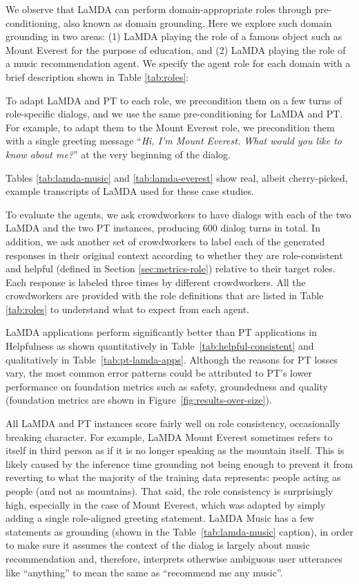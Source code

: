 We observe that LaMDA can perform domain-appropriate roles through pre-conditioning, also known as domain grounding. Here we explore such domain grounding in two areas: (1) LaMDA playing the role of  a famous object such as Mount Everest for the purpose of education, and (2) LaMDA playing the role of a music recommendation agent. We specify the agent role for each domain with a brief description shown in Table \ref{tab:roles}:

To adapt LaMDA and PT to each role, we precondition them on a few turns of role-specific dialogs, and we use the same pre-conditioning for LaMDA and PT. For example, to adapt them to the Mount Everest role, we precondition them with a single greeting message ``\textit{Hi, I’m Mount Everest. What would you like to know about me?}'' at the very beginning of the dialog. 

Tables \ref{tab:lamda-music} and \ref{tab:lamda-everest} show real, albeit cherry-picked, example transcripts of LaMDA used for these case studies.

\FloatBarrier

To evaluate the agents, we ask crowdworkers to have dialogs with each of the two LaMDA and the two PT instances, producing 600 dialog turns in total. In addition, we ask another set of crowdworkers to label each of the generated responses in their original context according to whether they are role-consistent and helpful (defined in Section \ref{sec:metrics-role}) relative to their target roles. Each response is labeled three times by different crowdworkers. All the crowdworkers are provided with the role definitions that are listed in Table \ref{tab:roles} to understand what to expect from each agent.

LaMDA applications perform significantly better than PT applications in Helpfulness as shown quantitatively in Table~\ref{tab:helpful-consistent} and qualitatively in Table~\ref{tab:pt-lamda-apps}. Although the reasons for PT losses vary, the most common error patterns could be attributed to PT's lower performance on foundation metrics such as safety, groundedness and quality (foundation metrics are shown in Figure~\ref{fig:results-over-size}).

All LaMDA and PT instances score fairly well on role consistency, occasionally breaking character. For example, LaMDA Mount Everest sometimes refers to itself in third person as if it is no longer speaking as the mountain itself. This is likely caused by the inference time grounding not being enough to prevent it from reverting to what the majority of the training data represents: people acting as people (and not as mountains). That said, the role consistency is surprisingly high, especially in the case of Mount Everest, which was adapted by simply adding a single role-aligned greeting statement. LaMDA Music has a few statements as grounding (shown in the Table~\ref{tab:lamda-music} caption), in order to make sure it assumes the context of the dialog is largely about music recommendation and, therefore, interprets otherwise ambiguous user utterances like ``anything'' to mean the same as ``recommend me any music''.

